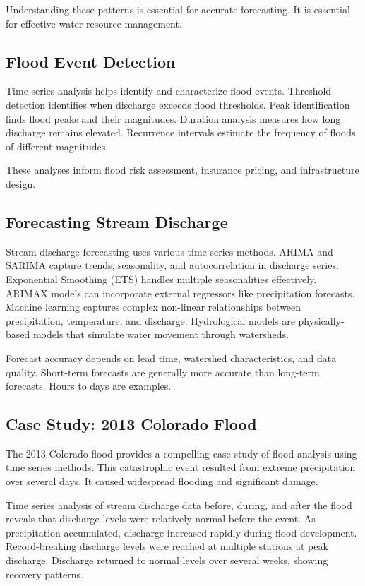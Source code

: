 Understanding these patterns is essential for accurate forecasting. It is essential for effective water resource management.

\subsection{Flood Event Detection}

Time series analysis helps identify and characterize flood events. Threshold detection identifies when discharge exceeds flood thresholds. Peak identification finds flood peaks and their magnitudes. Duration analysis measures how long discharge remains elevated. Recurrence intervals estimate the frequency of floods of different magnitudes.

These analyses inform flood risk assessment, insurance pricing, and infrastructure design.

\subsection{Forecasting Stream Discharge}

Stream discharge forecasting uses various time series methods. ARIMA and SARIMA capture trends, seasonality, and autocorrelation in discharge series. Exponential Smoothing (ETS) handles multiple seasonalities effectively. ARIMAX models can incorporate external regressors like precipitation forecasts. Machine learning captures complex non-linear relationships between precipitation, temperature, and discharge. Hydrological models are physically-based models that simulate water movement through watersheds.

Forecast accuracy depends on lead time, watershed characteristics, and data quality. Short-term forecasts are generally more accurate than long-term forecasts. Hours to days are examples.

\subsection{Case Study: 2013 Colorado Flood}

The 2013 Colorado flood provides a compelling case study of flood analysis using time series methods. This catastrophic event resulted from extreme precipitation over several days. It caused widespread flooding and significant damage.

Time series analysis of stream discharge data before, during, and after the flood reveals that discharge levels were relatively normal before the event. As precipitation accumulated, discharge increased rapidly during flood development. Record-breaking discharge levels were reached at multiple stations at peak discharge. Discharge returned to normal levels over several weeks, showing recovery patterns.

